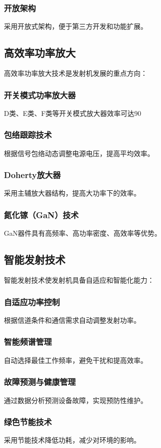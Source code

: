 \documentclass[12pt,UTF8]{ctexbook}
\begin{document}
\subsubsection{开放架构}
采用开放式架构，便于第三方开发和功能扩展。

\subsection{高效率功率放大}

高效率功率放大技术是发射机发展的重点方向：

\subsubsection{开关模式功率放大器}
D类、E类、F类等开关模式放大器效率可达90%

\subsubsection{包络跟踪技术}
根据信号包络动态调整电源电压，提高平均效率。

\subsubsection{Doherty放大器}
采用主辅放大器结构，提高大功率下的效率。

\subsubsection{氮化镓（GaN）技术}
GaN器件具有高频率、高功率密度、高效率等优势。

\subsection{智能发射技术}

智能发射技术使发射机具备自适应和智能化能力：

\subsubsection{自适应功率控制}
根据信道条件和通信需求自动调整发射功率。

\subsubsection{智能频谱管理}
自动选择最佳工作频率，避免干扰和提高效率。

\subsubsection{故障预测与健康管理}
通过数据分析预测设备故障，实现预防性维护。

\subsubsection{绿色节能技术}
采用节能技术降低功耗，减少对环境的影响。

\backmatter
\end{document}
